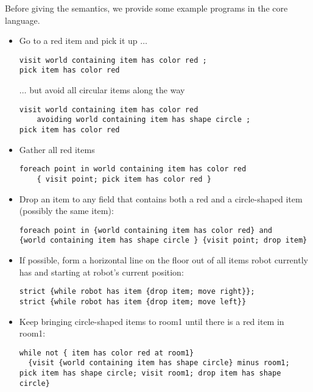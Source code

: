 \begin{example}\label{ex:core-syntax}
Before giving the semantics, we provide some example programs in the core language.
\begin{itemize}
\item Go to a red item and pick it up $\ldots$
\begin{lstlisting}
visit world containing item has color red ; 
pick item has color red
\end{lstlisting}
$\ldots$ but avoid all circular items along the way
\begin{lstlisting}
visit world containing item has color red 
    avoiding world containing item has shape circle ;
pick item has color red
\end{lstlisting}

\item Gather all red items
\begin{lstlisting}
foreach point in world containing item has color red 
    { visit point; pick item has color red }
\end{lstlisting}

\item Drop an item to any field that contains both a red and a circle-shaped item
(possibly the same item):
\begin{lstlisting}
foreach point in {world containing item has color red} and
{world containing item has shape circle } {visit point; drop item}
\end{lstlisting}

\item If possible, form a horizontal line on the floor out of all items robot
    currently has and starting at robot's current position:
    \begin{lstlisting}
strict {while robot has item {drop item; move right}};
strict {while robot has item {drop item; move left}}
    \end{lstlisting}

\item Keep bringing circle-shaped items to room1 until there is a red item in room1:
    \begin{lstlisting}
while not { item has color red at room1}
  {visit {world containing item has shape circle} minus room1;
pick item has shape circle; visit room1; drop item has shape circle}
    \end{lstlisting}
\end{itemize}
\end{example}



